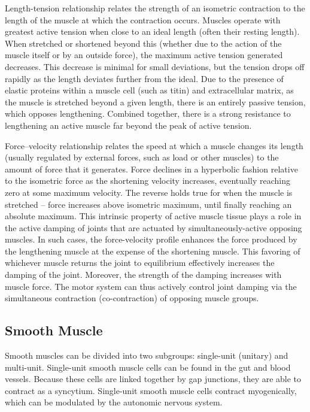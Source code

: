 Length-tension relationship relates the strength of an isometric contraction to the length of the muscle at which the contraction occurs. Muscles operate with greatest active tension when close to an ideal length (often their resting length). When stretched or shortened beyond this (whether due to the action of the muscle itself or by an outside force), the maximum active tension generated decreases. This decrease is minimal for small deviations, but the tension drops off rapidly as the length deviates further from the ideal. Due to the presence of elastic proteins within a muscle cell (such as titin) and extracellular matrix, as the muscle is stretched beyond a given length, there is an entirely passive tension, which opposes lengthening. Combined together, there is a strong resistance to lengthening an active muscle far beyond the peak of active tension.

Force--velocity relationship relates the speed at which a muscle changes its length (usually regulated by external forces, such as load or other muscles) to the amount of force that it generates. Force declines in a hyperbolic fashion relative to the isometric force as the shortening velocity increases, eventually reaching zero at some maximum velocity. The reverse holds true for when the muscle is stretched -- force increases above isometric maximum, until finally reaching an absolute maximum. This intrinsic property of active muscle tissue plays a role in the active damping of joints that are actuated by simultaneously-active opposing muscles. In such cases, the force-velocity profile enhances the force produced by the lengthening muscle at the expense of the shortening muscle. This favoring of whichever muscle returns the joint to equilibrium effectively increases the damping of the joint. Moreover, the strength of the damping increases with muscle force. The motor system can thus actively control joint damping via the simultaneous contraction (co-contraction) of opposing muscle groups.

\hypertarget{smooth-muscle}{%
\subsection{Smooth Muscle}\label{smooth-muscle}}

Smooth muscles can be divided into two subgroups: single-unit (unitary) and multi-unit. Single-unit smooth muscle cells can be found in the gut and blood vessels. Because these cells are linked together by gap junctions, they are able to contract as a syncytium. Single-unit smooth muscle cells contract myogenically, which can be modulated by the autonomic nervous system.

